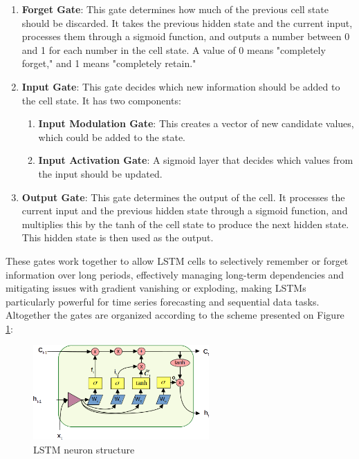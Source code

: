 \documentclass[sn-apa]{sn-jnl}%
\begin{document}
\begin{enumerate}
\item \textbf{Forget Gate}: This gate determines how much of the previous cell state should be discarded. It takes the previous hidden state and the current input, processes them through a sigmoid function, and outputs a number between 0 and 1 for each number in the cell state. A value of 0 means "completely forget," and 1 means "completely retain."

\item \textbf{Input Gate}: This gate decides which new information should be added to the cell state. It has two components:
\begin{enumerate}
\item \textbf{Input Modulation Gate}: This creates a vector of new candidate values, which could be added to the state.
\item \textbf{Input Activation Gate}: A sigmoid layer that decides which values from the input should be updated.
\end{enumerate}
\item \textbf{Output Gate}: This gate determines the output of the cell. It processes the current input and the previous hidden state through a sigmoid function, and multiplies this by the tanh of the cell state to produce the next hidden state. This hidden state is then used as the output.
\end{enumerate}

These gates work together to allow LSTM cells to selectively remember or forget information over long periods, effectively managing long-term dependencies and mitigating issues with gradient vanishing or exploding, making LSTMs particularly powerful for time series forecasting and sequential data tasks. Altogether the gates are organized according to the scheme presented on Figure \ref{fig1}:

\begin{figure}[H]
\centering
\includegraphics[width=0.6\textwidth]{Fig1.png}
\caption{LSTM neuron structure}\label{fig1}
\end{figure}
\end{document}

